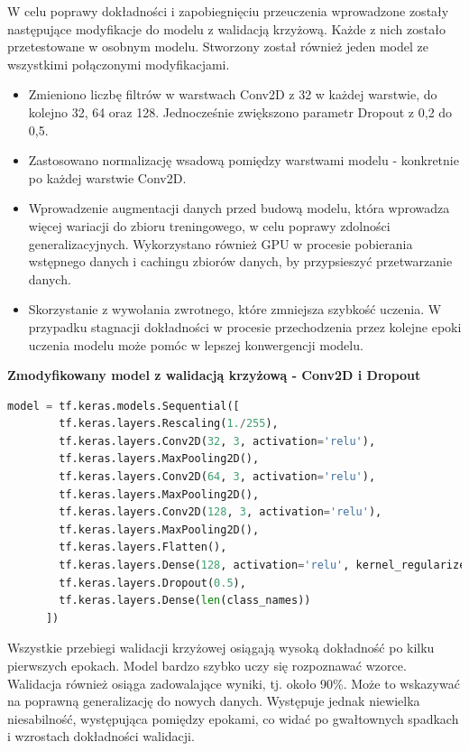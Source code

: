 W celu poprawy dokładności i zapobiegnięciu przeuczenia wprowadzone
zostały następujące modyfikacje do modelu z walidacją krzyżową.
Każde z nich zostało przetestowane w osobnym modelu.
Stworzony został również jeden model ze wszystkimi połączonymi modyfikacjami. 
\begin{itemize}[label=-,labelsep=0.4cm,leftmargin=0.6cm]
    \item Zmieniono liczbę filtrów w warstwach Conv2D z 32 w każdej warstwie, do kolejno 32, 64 oraz 128.
		Jednocześnie zwiększono parametr Dropout z 0,2 do 0,5.
    \item Zastosowano normalizację wsadową pomiędzy warstwami modelu - konkretnie po każdej warstwie Conv2D.
    \item Wprowadzenie augmentacji danych przed budową modelu, która wprowadza więcej wariacji do zbioru treningowego,
		w celu poprawy zdolności generalizacyjnych.
		Wykorzystano również GPU w procesie pobierania wstępnego danych i cachingu zbiorów danych, by przypsieszyć przetwarzanie danych.
	\item Skorzystanie z wywołania zwrotnego, które zmniejsza szybkość uczenia.
		W przypadku stagnacji dokładności w procesie przechodzenia przez kolejne epoki uczenia modelu
		może pomóc w lepszej konwergencji modelu.
\end{itemize}

\textbf{Zmodyfikowany model z walidacją krzyżową - Conv2D i Dropout}

\begin{lstlisting}[language=Python,caption=Listing zmodyfikowanego skryptu tworzącego model z walidacją krzyżową - wersja 1,
	label={tests-model-crossval1}]
	model = tf.keras.models.Sequential([
		tf.keras.layers.Rescaling(1./255),
		tf.keras.layers.Conv2D(32, 3, activation='relu'),
		tf.keras.layers.MaxPooling2D(),
		tf.keras.layers.Conv2D(64, 3, activation='relu'),
		tf.keras.layers.MaxPooling2D(),
		tf.keras.layers.Conv2D(128, 3, activation='relu'),
		tf.keras.layers.MaxPooling2D(),
		tf.keras.layers.Flatten(),
		tf.keras.layers.Dense(128, activation='relu', kernel_regularizer=tf.keras.regularizers.l2(0.01)),
		tf.keras.layers.Dropout(0.5),
		tf.keras.layers.Dense(len(class_names))
	  ])
\end{lstlisting}

Wszystkie przebiegi walidacji krzyżowej osiągają wysoką dokładność po kilku pierwszych epokach.
Model bardzo szybko uczy się rozpoznawać wzorce.
Walidacja również osiąga zadowalające wyniki, tj. około 90\%. Może to wskazywać na poprawną generalizację do nowych danych.
Występuje jednak niewielka niesabilność, występująca pomiędzy epokami,
co widać po gwałtownych spadkach i wzrostach dokładności walidacji.

